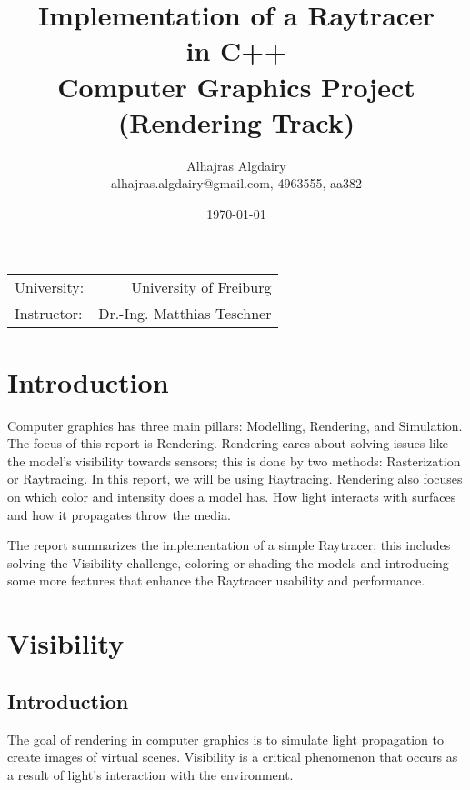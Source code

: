 \documentclass{article}
\title{Implementation of a Raytracer \\ in C++ \\ Computer Graphics Project (Rendering Track)} %
\author{Alhajras Algdairy \\alhajras.algdairy@gmail.com, 4963555, aa382} %
\date{\today} %
\begin{document}
	
	\maketitle %
	
	\begin{center}
		\begin{tabular}{l r}
			University: & University of Freiburg \\ %
			Instructor: &Dr.-Ing. Matthias Teschner %
		\end{tabular}
	\end{center}
	\clearpage
	
	\tableofcontents
	\clearpage
	\section{Introduction}
	Computer graphics has three main pillars: Modelling, Rendering, and Simulation. The focus of this report is Rendering. Rendering cares about solving issues like the model's visibility towards sensors; this is done by two methods: Rasterization or Raytracing. In this report, we will be using Raytracing. Rendering also focuses on which color and intensity does a model has. How light interacts with surfaces and how it propagates throw the media.
	
	The report summarizes the implementation of a simple Raytracer; this includes solving the Visibility challenge, coloring or shading the models and introducing some more features that enhance the Raytracer usability and performance.
	
	\section{Visibility}
	\subsection{Introduction}
	The goal of rendering in computer graphics is to simulate light propagation to create images of virtual scenes. Visibility is a critical phenomenon that occurs as a result of light's interaction with the environment.
	
\end{document}
